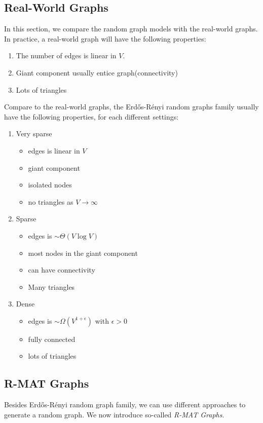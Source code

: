 \subsection{Real-World Graphs}
In this section, we compare the random graph models with the real-world graphs. In practice, a real-world graph will have the following
properties:
\begin{enumerate}
	\item The number of edges is linear in \(V\).
	\item Giant component usually entice graph(connectivity)
	\item Lots of triangles
\end{enumerate}

Compare to the real-world graphs, the Erdős-Rényi random graphs family usually have the following properties, for each different settings:
\begin{enumerate}
	\item Very sparse
	      \begin{itemize}
		      \item edges is linear in \(V\)
		      \item giant component
		      \item isolated nodes
		      \item no triangles as \(V\to \infty \)
	      \end{itemize}
	\item Sparse
	      \begin{itemize}
		      \item edges is \(\sim \Theta(V\log V)\)
		      \item most nodes in the giant component
		      \item can have connectivity
		      \item Many triangles
	      \end{itemize}
	\item Dense
	      \begin{itemize}
		      \item edges is \(\sim \Omega(V^{1+\epsilon})\) with \(\epsilon>0\)
		      \item fully connected
		      \item lots of triangles
	      \end{itemize}
\end{enumerate}

\subsection{R-MAT Graphs}
Besides Erdős-Rényi random graph family, we can use different approaches to generate a random graph. We now introduce so-called \emph{R-MAT Graphs}.
